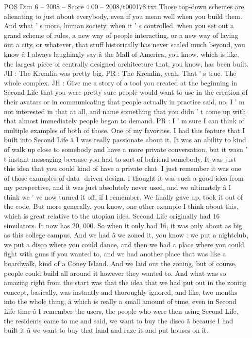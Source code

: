 \begin{textsample}{POS Dim 6 – 2008 – Score 4.00 – 2008/t000178.txt}
Those top-down schemes are alienating to just about everybody, even if you mean well when you build them.
And what ' s more, human society, when it ' s controlled, when you set out a grand scheme of rules, a new way of people interacting, or a new way of laying out a city, or whatever, that stuff historically has never scaled much beyond, you know â I always laughingly say â the Mall of America, you know, which is like, the largest piece of centrally designed architecture that, you know, has been built.
JH : The Kremlin was pretty big.
PR : The Kremlin, yeah.
That ' s true.
The whole complex.
JH : Give me a story of a tool you created at the beginning in Second Life that you were pretty sure people would want to use in the creation of their avatars or in communicating that people actually in practice said, no, I ' m not interested in that at all, and name something that you didn ' t come up with that almost immediately people began to demand.
PR : I ' m sure I can think of multiple examples of both of those.
One of my favorites.
I had this feature that I built into Second Life â I was really passionate about it.
It was an ability to kind of walk up close to somebody and have a more private conversation, but it wasn ' t instant messaging because you had to sort of befriend somebody.
It was just this idea that you could kind of have a private chat.
I just remember it was one of those examples of data- driven design.
I thought it was such a good idea from my perspective, and it was just absolutely never used, and we ultimately â I think we ' ve now turned it off, if I remember.
We finally gave up, took it out of the code.
But more generally, you know, one other example I think about this, which is great relative to the utopian idea.
Second Life originally had 16 simulators.
It now has 20, 000.
So when it only had 16, it was only about as big as this college campus.
And we had â we zoned it, you know : we put a nightclub, we put a disco where you could dance, and then we had a place where you could fight with guns if you wanted to, and we had another place that was like a boardwalk, kind of a Coney Island.
And we laid out the zoning, but of course, people could build all around it however they wanted to.
And what was so amazing right from the start was that the idea that we had put out in the zoning concept, basically, was instantly and thoroughly ignored, and like, two months into the whole thing, â which is really a small amount of time, even in Second Life time â I remember the users, the people who were then using Second Life, the residents came to me and said, we want to buy the disco â because I had built it â we want to buy that land and raze it and put houses on it.

\end{textsample}

